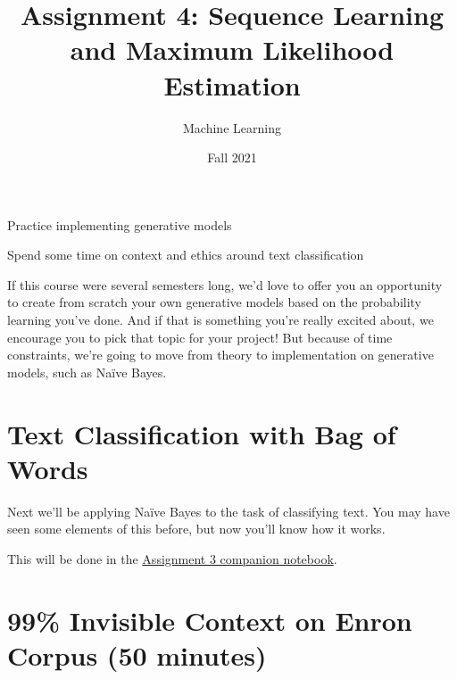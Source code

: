 \documentclass[assignment04_Solutions]{subfiles}
\title{Assignment 4: Sequence Learning and Maximum Likelihood Estimation}
\author{Machine Learning}
\date{Fall 2021}
\begin{document}
\maketitle
\thispagestyle{firstpage}


\begin{learningobjectives}
\bi
\item Practice implementing generative models
\item Spend some time on context and ethics around text classification
\ei
\end{learningobjectives}

If this course were several semesters long, we'd love to offer you an opportunity to create from scratch your own generative models based on the probability learning you've done. And if that is something you're really excited about, we encourage you to pick that topic for your project! But because of time constraints, we're going to move from theory to implementation on generative models, such as Na\"ive Bayes.





\section{Text Classification with Bag of Words}
Next we'll be applying Na\"ive Bayes to the task of classifying text. You may have seen some elements of this before, but now you'll know how it works.

\begin{externalresources}[(60 minutes)]
This will be done in the \href{https://colab.research.google.com/drive/15A8PncIi8zY_SscJdKK8GMrpSynJVucK?usp=sharing}{Assignment 3 companion notebook}.
\end{externalresources}



\section{99\% Invisible Context on Enron Corpus (50 minutes)}
\end{document}
